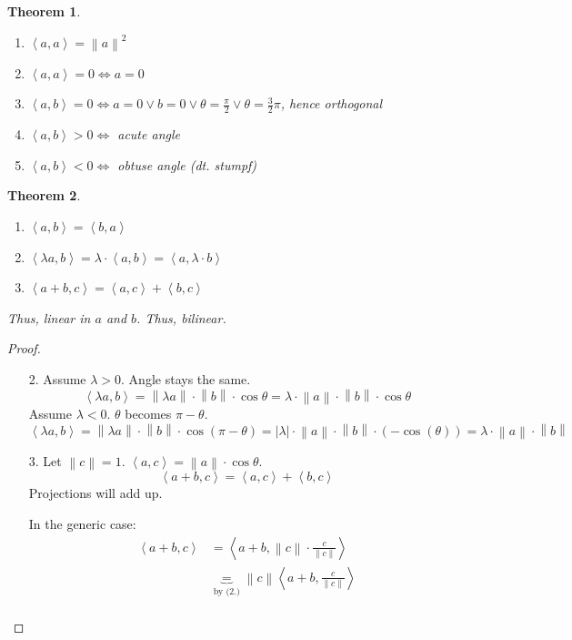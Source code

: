 \documentclass{article}
\newtheorem{theorem}{Theorem}  \numberwithin{theorem}{section}
\newcommand{\angel}[1]{\left\langle#1\right\rangle}
\newcommand{\norm}[1]{\left\|#1\right\|}
\newcommand{\card}[1]{\left|#1\right|}
\begin{document}
\begin{theorem} %
  \begin{enumerate}
    \item $\angel{a,a} = \norm{a}^2$
    \item $\angel{a,a} = 0 \iff a = 0$
    \item $\angel{a,b} = 0 \iff a = 0 \lor b = 0 \lor \theta = \frac\pi2 \lor \theta = \frac32 \pi$, hence orthogonal
    \item $\angel{a,b} > 0 \iff$ acute angle
    \item $\angel{a,b} < 0 \iff$ obtuse angle (dt. \foreignlanguage{ngerman}{stumpf})
  \end{enumerate}
\end{theorem}

\begin{theorem} %
  \label{satz83}
  \begin{enumerate}
    \item $\angel{a,b} = \angel{b,a}$
    \item $\angel{\lambda a, b} = \lambda \cdot \angel{a, b} = \angel{a, \lambda \cdot b}$
    \item $\angel{a+b, c} = \angel{a,c} + \angel{b, c}$
  \end{enumerate}
  Thus, linear in $a$ and $b$. Thus, bilinear.
\end{theorem}

\begin{proof}
  \begin{enumerate}
    \item[2.]
      Assume $\lambda > 0$. Angle stays the same.
      \[ \angel{\lambda a, b} = \norm{\lambda a} \cdot \norm{b} \cdot \cos\theta = \lambda \cdot \norm{a} \cdot \norm{b} \cdot \cos\theta \]
      Assume $\lambda < 0$. $\theta$ becomes $\pi - \theta$.
      \[ \angel{\lambda a, b} = \norm{\lambda a} \cdot \norm{b} \cdot \cos(\pi - \theta) = \card{\lambda} \cdot \norm{a} \cdot \norm{b} \cdot (-\cos(\theta)) = \lambda \cdot \norm a \cdot \norm b \]
    \item[3.]
      Let $\norm{c} = 1$. $\angel{a,c} = \norm a \cdot \cos\theta$.
      \[ \angel{a+b, c} = \angel{a,c} + \angel{b,c} \]
      Projections will add up.

      In the generic case:
      \begin{align*}
        \angel{a+b, c} &= \angel{a+b, \norm c \cdot \frac{c}{\norm{c}}} \\
          &\underbrace{=}_{\text{by (2.)}} \norm c \angel{a+b, \frac{c}{\norm{c}}} \\
      \end{align*}
  \end{enumerate}
\end{proof}
\end{document}
